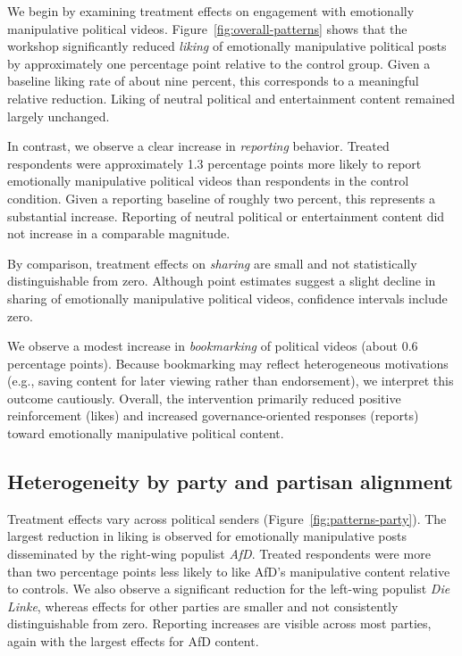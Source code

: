 \documentclass[12pt]{article}
\begin{document}
We begin by examining treatment effects on engagement with emotionally manipulative political videos. Figure~\ref{fig:overall-patterns} shows that the workshop significantly reduced \textit{liking} of emotionally manipulative political posts by approximately one percentage point relative to the control group. Given a baseline liking rate of about nine percent, this corresponds to a meaningful relative reduction. Liking of neutral political and entertainment content remained largely unchanged.

In contrast, we observe a clear increase in \textit{reporting} behavior. Treated respondents were approximately 1.3 percentage points more likely to report emotionally manipulative political videos than respondents in the control condition. Given a reporting baseline of roughly two percent, this represents a substantial increase. Reporting of neutral political or entertainment content did not increase in a comparable magnitude.

By comparison, treatment effects on \textit{sharing} are small and not statistically distinguishable from zero. Although point estimates suggest a slight decline in sharing of emotionally manipulative political videos, confidence intervals include zero.

We observe a modest increase in \textit{bookmarking} of political videos (about 0.6 percentage points). Because bookmarking may reflect heterogeneous motivations (e.g., saving content for later viewing rather than endorsement), we interpret this outcome cautiously. Overall, the intervention primarily reduced positive reinforcement (likes) and increased governance-oriented responses (reports) toward emotionally manipulative political content.

\subsection*{Heterogeneity by party and partisan alignment}

Treatment effects vary across political senders (Figure~\ref{fig:patterns-party}). The largest reduction in liking is observed for emotionally manipulative posts disseminated by the right-wing populist \emph{AfD}. Treated respondents were more than two percentage points less likely to like AfD’s manipulative content relative to controls. We also observe a significant reduction for the left-wing populist \textit{Die Linke}, whereas effects for other parties are smaller and not consistently distinguishable from zero. Reporting increases are visible across most parties, again with the largest effects for AfD content.
\end{document}
